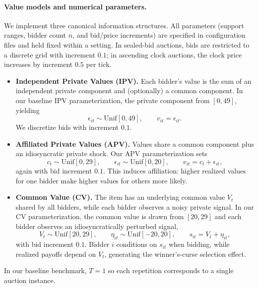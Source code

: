\documentclass{article} %
\begin{document}
\paragraph{Value models and numerical parameters.}
We implement three canonical information structures. All parameters (support ranges, bidder count $n$, and bid/price increments) are specified in configuration files and held fixed within a setting. In sealed-bid auctions, bids are restricted to a discrete grid with increment $0.1$; in ascending clock auctions, the clock price increases by increment $0.5$ per tick.

\begin{itemize}
    \item \textbf{Independent Private Values (IPV).} Each bidder's value is the sum of an independent private component and (optionally) a common component. In our baseline IPV parameterization, the private component from $[0,49]$, yielding
    \[
          \epsilon_{it} \sim \mathrm{Unif}[0,49], \qquad v_{it}=\epsilon_{it}.
    \]
    We discretize bids with increment $0.1$.

    \item \textbf{Affiliated Private Values (APV).} Values share a common component plus an idiosyncratic private shock. Our APV parameterization sets
    \[
        c_t \sim \mathrm{Unif}[0,29], \qquad \epsilon_{it} \sim \mathrm{Unif}[0,20], \qquad v_{it}=c_t+\epsilon_{it},
    \]
    again with bid increment $0.1$. This induces affiliation: higher realized values for one bidder make higher values for others more likely.

    \item \textbf{Common Value (CV).} The item has an underlying common value $V_t$ shared by all bidders, while each bidder observes a noisy private signal. In our CV parameterization, the common value is drawn from $[20,29]$ and each bidder observes an idiosyncratically perturbed signal,
    \[
        V_t \sim \mathrm{Unif}[20,29], \qquad \eta_{it} \sim \mathrm{Unif}[-20,20], \qquad s_{it}=V_t+\eta_{it},
    \]
    with bid increment $0.1$. Bidder $i$ conditions on $s_{it}$ when bidding, while realized payoffs depend on $V_t$, generating the winner's-curse selection effect.
\end{itemize}
In our baseline benchmark, $T=1$ so each repetition corresponds to a single auction instance.
\end{document}
